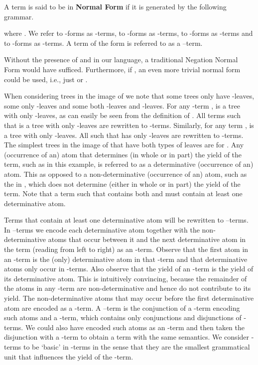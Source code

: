 \begin{definition}
\label{def:snf}
A term  is said to be in \textbf{ Normal Form } if it
is generated by the following grammar.

where . We refer to -forms as -terms, to -forms as
-terms, to -forms as -terms and to -forms as
-terms. A term of the form  is referred to as a
--term.
\end{definition}

Without the presence of  and  in our language, a traditional
Negation Normal Form would have sufficed. Furthermore, if , an
even more trivial normal form could be used, i.e., just  or .

When considering trees in the image of  we note that some trees only have
-leaves, some only -leaves and some both -leaves and
-leaves. For any -term ,  is a tree
with only -leaves, as can easily be seen from the definition of .
All terms  such that  is a tree with only -leaves are
rewritten to -terms. Similarly, for any term ,  is a tree with only -leaves. All  such that  has
only -leaves are rewritten to -terms. The simplest trees in the
image of  that have both types of leaves are  for . Any
(occurrence of an) atom that determines (in whole or in part) the yield of the
term, such as  in this example, is referred to as a determinative (occurrence
of an) atom. This as opposed to a non-determinative (occurrence of an) atom,
such as the  in , which does not determine (either in
whole or in part) the yield of the term.  Note that a term  such that
 contains both  and  must contain at least one
determinative atom.

Terms that contain at least one determinative atom will be rewritten to
--terms. In --terms we encode each determinative atom
together with the non-determinative atoms that occur between it and the next
determinative atom in the term (reading from left to right) as an -term.
Observe that the first atom in an -term is the (only) determinative atom
in that -term and that determinative atoms only occur in -terms.
Also observe that the yield of an -term is the yield of its determinative
atom. This is intuitively convincing, because the remainder of the atoms in any
-term are non-determinative and hence do not contribute to its yield. The
non-determinative atoms that may occur before the first determinative atom are
encoded as a -term. A --term is the conjunction of a
-term encoding such atoms and a -term, which contains only
conjunctions and disjunctions of -terms. We could also have encoded such
atoms as an -term and then taken the disjunction with a -term to
obtain a term with the same semantics. We consider -terms to be `basic'
in -terms in the sense that they are the smallest grammatical unit that
influences the yield of the -term.

